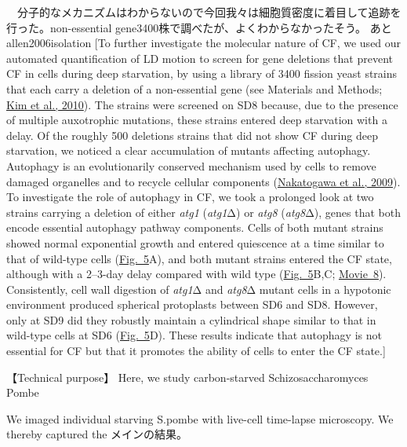 　分子的なメカニズムはわからないので今回我々は細胞質密度に着目して追跡を行った。non-essential gene3400株で調べたが、よくわからなかったそう。
あとallen2006isolation
[To further investigate the molecular nature of CF, we used our automated quantification of LD motion to screen for gene deletions that prevent CF in cells during deep starvation, by using a library of 3400 fission yeast strains that each carry a deletion of a non-essential gene (see Materials and Methods; \href{https://pmc.ncbi.nlm.nih.gov/articles/PMC6857596/\#JCS231688C32}{Kim et al., 2010}). The strains were screened on SD8 because, due to the presence of multiple auxotrophic mutations, these strains entered deep starvation with a delay. Of the roughly 500 deletions strains that did not show CF during deep starvation, we noticed a clear accumulation of mutants affecting autophagy. Autophagy is an evolutionarily conserved mechanism used by cells to remove damaged organelles and to recycle cellular components (\href{https://pmc.ncbi.nlm.nih.gov/articles/PMC6857596/\#JCS231688C52}{Nakatogawa et al., 2009}). To investigate the role of autophagy in CF, we took a prolonged look at two strains carrying a deletion of either \textit{atg1} (\textit{atg1}Δ) or \textit{atg8} (\textit{atg8}Δ), genes that both encode essential autophagy pathway components. Cells of both mutant strains showed normal exponential growth and entered quiescence at a time similar to that of wild-type cells (\href{https://pmc.ncbi.nlm.nih.gov/articles/PMC6857596/\#JCS231688F5}{Fig. 5}A), and both mutant strains entered the CF state, although with a 2–3-day delay compared with wild type (\href{https://pmc.ncbi.nlm.nih.gov/articles/PMC6857596/\#JCS231688F5}{Fig. 5}B,C; \href{http://movie.biologists.com/video/10.1242/jcs.231688/video-8}{Movie 8}). Consistently, cell wall digestion of \textit{atg1}Δ and \textit{atg8}Δ mutant cells in a hypotonic environment produced spherical protoplasts between SD6 and SD8. However, only at SD9 did they robustly maintain a cylindrical shape similar to that in wild-type cells at SD6 (\href{https://pmc.ncbi.nlm.nih.gov/articles/PMC6857596/\#JCS231688F5}{Fig. 5}D). These results indicate that autophagy is not essential for CF but that it promotes the ability of cells to enter the CF state.]

【Technical purpose】
Here, we study carbon-starved {Schizosaccharomyces Pombe}

We imaged individual starving {S.pombe} with live-cell time-lapse microscopy.
We thereby captured the メインの結果。

